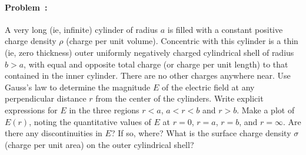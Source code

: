 \documentclass[12pt]{article}
\begin{document}
\paragraph{Problem~\theproblem:}%
A very long (ie, infinite) cylinder of radius $a$ is filled with a
constant positive charge density $\rho$ (charge per unit volume).
Concentric with this cylinder is a thin (ie, zero thickness) outer
uniformly negatively charged cylindrical shell of radius $b>a$, with
equal and opposite total charge (or charge per unit length) to that
contained in the inner cylinder.  There are no other charges anywhere near.  Use
Gauss's law to determine the magnitude $E$ of the electric field at
any perpendicular distance $r$ from the center of the cylinders.
Write explicit expressions for $E$ in the three regions $r<a$, $a<r<b$
and $r>b$.  Make a plot of $E(r)$, noting the quantitative values of
$E$ at $r=0$, $r=a$, $r=b$, and $r=\infty$.  Are there any
discontinuities in $E$?  If so, where?  What is the surface charge
density $\sigma$ (charge per unit area) on the outer cylindrical
shell?
\end{document}
